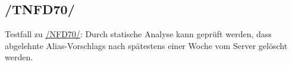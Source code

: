 \subsection*{/TNFD70/}
\label{/TNFD70/} Testfall zu \hyperref[/NFD70/]{/NFD70/}: Durch \gls{statische Analyse} kann geprüft werden, dass abgelehnte \Glspl{Alias-Vorschlag} nach spätestens einer Woche vom \Gls{Server} gelöscht werden.